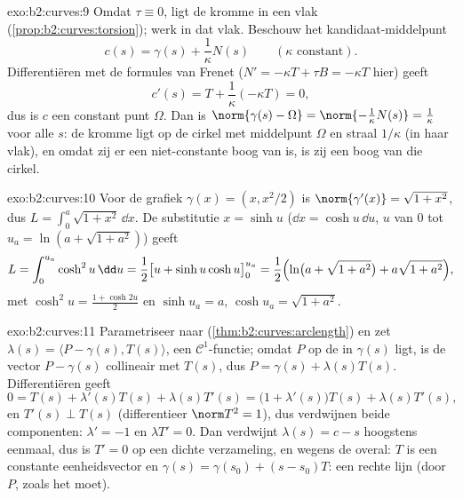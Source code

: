 \begin{solution}{exo:b2:curves:9}
Omdat $\tau \equiv 0$, ligt de kromme in een vlak
(\cref{prop:b2:curves:torsion}); werk in dat vlak. Beschouw het
kandidaat-middelpunt
\[
c(s) = \gamma(s) + \frac{1}{\kappa}N(s)
\qquad (\kappa \text{ constant}).
\]
Differentiëren met de formules van Frenet ($N' = -\kappa T + \tau B
= -\kappa T$ hier) geeft
\[
c'(s) = T + \frac1\kappa(-\kappa T) = 0 ,
\]
dus is $c$ een constant punt $\Omega$. Dan is $\norm{\gamma(s) -
\Omega} = \norm{-\frac1\kappa N(s)} = \frac1\kappa$ voor alle $s$:
de kromme ligt op de cirkel met middelpunt $\Omega$ en straal
$1/\kappa$ (in haar vlak), en omdat zij er een niet-constante boog
van is, is zij een boog van die cirkel.
\end{solution}

\begin{solution}{exo:b2:curves:10}
Voor de grafiek $\gamma(x) = (x, x^2/2)$ is $\norm{\gamma'(x)} =
\sqrt{1 + x^2}$, dus $L = \int_0^a\sqrt{1+x^2}\,\dd x$. De
substitutie $x = \sinh u$ ($\dd x = \cosh u\,\dd u$, $u$ van $0$
tot $u_a = \ln(a + \sqrt{1+a^2})$) geeft
\[
L = \int_0^{u_a}\cosh^2 u\,\dd u
= \frac12\bigl[u + \sinh u\cosh u\bigr]_0^{u_a}
= \frac12\Bigl(\ln\bigl(a + \sqrt{1+a^2}\bigr) +
a\sqrt{1+a^2}\Bigr),
\]
met $\cosh^2 u = \frac{1 + \cosh 2u}2$ en $\sinh u_a = a$, $\cosh
u_a = \sqrt{1 + a^2}$.
\end{solution}

\begin{solution}{exo:b2:curves:11}
Parametriseer naar  (\cref{thm:b2:curves:arclength}) en
zet $\lambda(s) = \langle P - \gamma(s), T(s)\rangle$, een
$\mathcal C^1$-functie; omdat $P$ op de  in $\gamma(s)$
ligt, is de vector $P - \gamma(s)$ collineair met $T(s)$, dus $P =
\gamma(s) + \lambda(s)T(s)$. Differentiëren geeft
\[
0 = T(s) + \lambda'(s)T(s) + \lambda(s)T'(s)
= \bigl(1 + \lambda'(s)\bigr)T(s) + \lambda(s)T'(s),
\]
en $T'(s) \perp T(s)$ (differentieer $\norm T^2 = 1$), dus
verdwijnen beide componenten: $\lambda' = -1$ en $\lambda T' = 0$.
Dan verdwijnt $\lambda(s) = c - s$ hoogstens eenmaal, dus is $T' =
0$ op een dichte verzameling, en wegens de  overal: $T$
is een constante eenheidsvector en $\gamma(s) = \gamma(s_0) + (s -
s_0)T$: een rechte lijn (door $P$, zoals het moet).
\end{solution}

